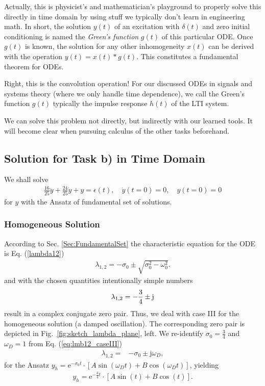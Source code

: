 \documentclass[a4paper,11pt,oneside]{scrartcl}
\newcommand{\eq}[1]{Eq. (\ref{#1})}
\begin{document}
Actually, this is physicist's and mathematician's playground to properly solve
this directly in time domain by using stuff we typically don't learn in
engineering math.
%
In short, the solution $y(t)$ of an excitation with $\delta(t)$ and
zero initial conditioning is named the
\textit{Green's function} $g(t)$ of this particular ODE. Once $g(t)$ is known,
the solution for any other inhomogeneity $x(t)$ can be derived with the
operation $y(t) = x(t) * g(t)$. This constitutes a fundamental theorem for ODEs.

Right, this is the convolution operation! For our discussed ODEs in signals and
systems theory (where we only handle time dependence), we call the Green's
function $g(t)$ typically the impulse response $h(t)$ of the LTI system.

We can solve this problem not directly, but indirectly with our learned tools.
It will become clear when pursuing calculus of the other tasks beforehand.

\subsection{Solution for Task b) in Time Domain}
We shall solve
\begin{align}
\frac{16}{25} \ddot{y} + \frac{24}{25} \dot{y} + y = \epsilon(t), \quad
\dot{y}(t=0) = 0,\quad y(t=0)=0
\end{align}
for $y$ with the Ansatz of fundamental set of solutions.

\subsubsection{Homogeneous Solution}
\label{Sec:TaskbHomo}
According to Sec. \ref{Sec:FundamentalSet} the characteristic equation for the
ODE is \eq{lambda12}
\begin{align}
\lambda_{1,2} = -\sigma_0 \pm \sqrt{\sigma_0^2 - \omega_0^2}.
\end{align}
and with the chosen quantities intentionally simple numbers
\begin{align}
\lambda_{1,2} = -\frac{3}{4} \pm \im
\end{align}
result in a complex conjugate zero pair.
Thus, we deal with case III for the homogeneous solution (a damped oscillation).
The corresponding zero pair is depicted in Fig.~\ref{fig:sketch_lambda_plane},
left.
%
We re-identify $\sigma_0 = \frac{3}{4}$ and $\omega_D = 1$ from
\eq{eq:lmb12_caseIII}
\begin{align}
\lambda_{1,2} =& -\sigma_0 \pm \mathrm{j}\omega_D,
\end{align}
for the Ansatz
$y_h = \mathrm{e}^{-\sigma_0 t} \cdot
\left[ A \sin(\omega_D t) + B \cos(\omega_D t)\right]$,
yielding
\begin{align}
y_h = \mathrm{e}^{-\frac{3}{4} t} \cdot
\left[ A \sin(t) + B \cos(t)\right].
\end{align}
\end{document}
